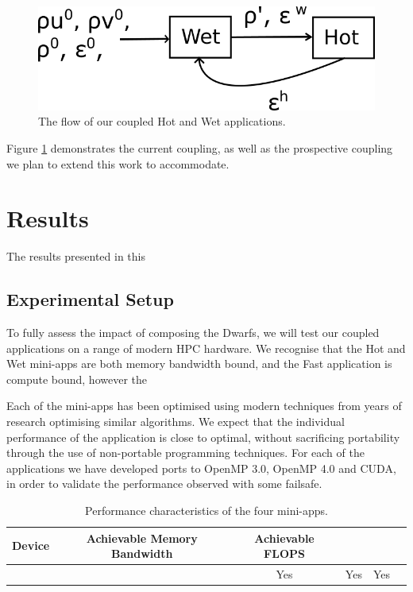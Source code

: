 \documentclass[runningheads,a4paper]{llncs}
\begin{document}
\begin{figure}
  \centering
  \includegraphics[width=0.6\linewidth]{hot-wet-flow}
  \caption{The flow of our coupled Hot and Wet applications.}
  \label{fig:hot-wet-flow}
\end{figure}

Figure \ref{fig:hot-wet-flow} demonstrates the current coupling, as well as the prospective coupling we plan to extend this work to accommodate. 

\section{Results}

The results presented in this 

\subsection{Experimental Setup}

To fully assess the impact of composing the Dwarfs, we will test our coupled applications on a range of modern HPC hardware. We recognise that the Hot and Wet mini-apps are both memory bandwidth bound, and the Fast application is compute bound, however the 

Each of the mini-apps has been optimised using modern techniques from years of research optimising similar algorithms. We expect that the individual performance of the application is close to optimal, without sacrificing portability through the use of non-portable programming techniques. For each of the applications we have developed ports to OpenMP 3.0, OpenMP 4.0 and CUDA, in order to validate the performance observed with some failsafe.

\begin{table}[h]
  \begin{center}
    \begin{tabular}{cccccc}
      \hline
      \textbf{Device} & \textbf{Achievable Memory Bandwidth} & \textbf{Achievable FLOPS}  \\
      \hline
      \textit{\textbf{}} &  & Yes & Yes & Yes \\
    \end{tabular}
  \end{center}
  \caption{Performance characteristics of the four mini-apps.}
  \label{tab:perf-char-mini-apps}
\end{table}
\end{document}
